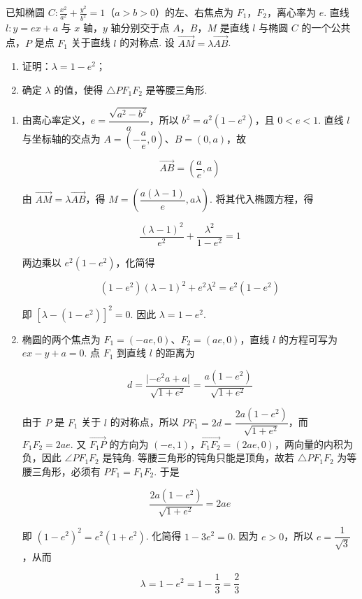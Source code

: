 \begin{problem}
已知椭圆 \(C: \frac{x^2}{a^2} + \frac{y^2}{b^2} = 1\)（\(a > b > 0\)）的左、右焦点为 \(F_1\)，\(F_2\)，离心率为 \(e\). 直线 \(l: y = ex + a\) 与 \(x\) 轴，\(y\) 轴分别交于点 \(A\)，\(B\)，\(M\) 是直线 \(l\) 与椭圆 \(C\) 的一个公共点，\(P\) 是点 \(F_1\) 关于直线 \(l\) 的对称点. 设 \(\overrightarrow{AM} = \lambda \overrightarrow{AB}\).

\begin{enumerate}
\item 证明：\(\lambda=1-e^{2}\)；
\item 确定 \(\lambda\) 的值，使得 \(\triangle PF_{1}F_{2}\) 是等腰三角形.
\end{enumerate}

\begin{solution}
\begin{enumerate}
\item 由离心率定义，\(e=\dfrac{\sqrt{a^{2}-b^{2}}}{a}\)，所以 \(b^{2}=a^{2}(1-e^{2})\)，且 \(0<e<1\). 直线 \(l\) 与坐标轴的交点为 \(A=\left(-\dfrac{a}{e},0\right)\)、\(B=(0,a)\)，故

\[
\overrightarrow{AB}=\left(\frac{a}{e},a\right)
\]

由 \(\overrightarrow{AM}=\lambda\overrightarrow{AB}\)，得 \(M=\left(\dfrac{a(\lambda-1)}{e},a\lambda\right)\). 将其代入椭圆方程，得

\[
\frac{(\lambda-1)^{2}}{e^{2}}+\frac{\lambda^{2}}{1-e^{2}}=1
\]

两边乘以 \(e^{2}(1-e^{2})\)，化简得

\[
(1-e^{2})(\lambda-1)^{2}+e^{2}\lambda^{2}=e^{2}(1-e^{2})
\]

即 \(\left[\lambda-(1-e^{2})\right]^{2}=0\). 因此 \(\lambda=1-e^{2}\).

\item 椭圆的两个焦点为 \(F_{1}=(-ae,0)\)、\(F_{2}=(ae,0)\)，直线 \(l\) 的方程可写为 \(ex-y+a=0\). 点 \(F_{1}\) 到直线 \(l\) 的距离为

\[
d=\frac{\lvert-e^{2}a+a\rvert}{\sqrt{1+e^{2}}}=\frac{a(1-e^{2})}{\sqrt{1+e^{2}}}
\]

由于 \(P\) 是 \(F_{1}\) 关于 \(l\) 的对称点，所以 \(PF_{1}=2d=\dfrac{2a(1-e^{2})}{\sqrt{1+e^{2}}}\)，而 \(F_{1}F_{2}=2ae\). 又 \(\overrightarrow{F_{1}P}\) 的方向为 \((-e,1)\)，\(\overrightarrow{F_{1}F_{2}}=(2ae,0)\)，两向量的内积为负，因此 \(\angle PF_{1}F_{2}\) 是钝角. 等腰三角形的钝角只能是顶角，故若 \(\triangle PF_{1}F_{2}\) 为等腰三角形，必须有 \(PF_{1}=F_{1}F_{2}\). 于是

\[
\frac{2a(1-e^{2})}{\sqrt{1+e^{2}}}=2ae
\]

即 \((1-e^{2})^{2}=e^{2}(1+e^{2})\). 化简得 \(1-3e^{2}=0\). 因为 \(e>0\)，所以 \(e=\dfrac{1}{\sqrt{3}}\)，从而

\[
\lambda=1-e^{2}=1-\frac{1}{3}=\frac{2}{3}
\]
\end{enumerate}
\end{solution}
\end{problem}

